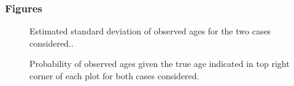 \documentclass[11pt]{book}
\begin{document}
\hypertarget{figures-1}{%
\subsubsection{Figures}\label{figures-1}}
\begin{figure}[htb]

{\centering {} 

}

\caption{Estimated standard deviation of observed ages for the two cases considered..}\label{fig:unnamed-chunk-32}
\end{figure}
\newpage
\begin{figure}[htb]

{\centering {} 

}

\caption{Probability of observed ages given the true age indicated in top right corner of each plot for both cases considered.}\label{fig:unnamed-chunk-33}
\end{figure}
\end{document}
